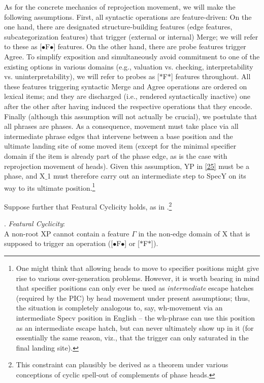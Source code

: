 \documentclass[output=paper
,modfonts
,nonflat]{langsci/langscibook}
\begin{document}
As for the concrete mechanics of reprojection movement, we will make
the following assumptions. First,  all syntactic operations are
feature-driven: On the one hand, there are designated   structure-building features (edge features, subcategorization
features) that trigger (external or internal) Merge; we will refer to
these as [{\small $\bullet$}F{\small $\bullet$}] features. On the
other hand, there are   probe features trigger Agree. To simplify
exposition and simultaneously avoid commitment to one of the existing options in
various domains (e.g., valuation vs. checking, interpretability
vs. uninterpretability), we will refer to probes as 
 [$*$F$*$] features throughout.
All these features triggering syntactic Merge and Agree operations are
ordered on lexical items; and they are discharged (i.e., rendered
syntactically inactive) one after the other
after having induced the respective operations that they encode. 
Finally (although this assumption will not actually be crucial), we
postulate that all phrases are phases. As a consequence, movement must take place via all
  intermediate phrase edges  that intervene between a base position and
  the ultimate landing site of some moved item (except for the minimal
  specifier domain if the item is already part of the phase edge, as
  is the case with reprojection movement of heads). Given this
  assumption, YP in \ref{25} must be a phase, and X$\_$1 must therefore
  carry out an intermediate step to SpecY on its way to its ultimate
  position.\footnote{One might think that allowing heads to move to
    specifier positions might give rise to various over-generation
    problems. However, it is worth bearing in mind that specifier
    positions can only ever be used as {\it intermediate} escape
    hatches (required by the PIC) by head movement under present
    assumptions; thus, the situation is completely analogous to, say,
    wh-movement via an intermediate Specv position in English -- the
    wh-phrase can use this position as an intermediate escape hatch,
    but can never ultimately show up in it (for essentially the same
    reason, viz., that the trigger can only saturated in the final
    landing site).}

Suppose further that Featural Cyclicity holds, as in
\Next.\footnote{This constraint can plausibly be derived as a theorem
  under various conceptions of cyclic spell-out of complements of
  phase heads.}

\Lsciex. {\it Featural \label{fc}Cyclicity}:\\
A non-root XP cannot contain a feature $\Gamma$ in the non-edge domain
of X that is supposed to trigger an operation
([{\small $\bullet$}F{\small $\bullet$}] or [$*$F$*$]).
\end{document}
